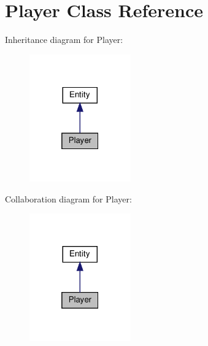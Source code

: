 \hypertarget{class_player}{}\section{Player Class Reference}
\label{class_player}


Inheritance diagram for Player\+:
\nopagebreak
\begin{figure}[H]
\begin{center}
\leavevmode
\includegraphics[width=124pt]{class_player__inherit__graph}
\end{center}
\end{figure}


Collaboration diagram for Player\+:
\nopagebreak
\begin{figure}[H]
\begin{center}
\leavevmode
\includegraphics[width=124pt]{class_player__coll__graph}
\end{center}
\end{figure}
